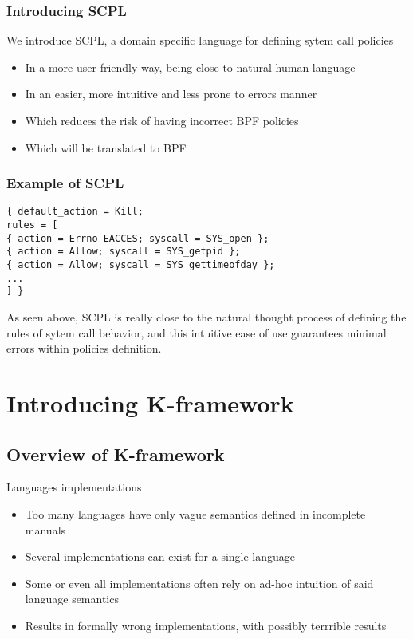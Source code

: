 \documentclass{beamer}
\begin{document}
\begin{frame}\frametitle{Introducing SCPL}
We introduce SCPL, a domain specific language for defining sytem call policies
\begin{itemize}[<+->]
	\item In a more user-friendly way, being close to natural human language
	\item In an easier, more intuitive and less prone to errors manner
	\item Which reduces the risk of having incorrect BPF policies
	\item Which will be translated to BPF
 \end{itemize}
\end{frame}

\begin{frame}[fragile]\frametitle{Example of SCPL}
\begin{verbatim}
{ default_action = Kill;
rules = [
{ action = Errno EACCES; syscall = SYS_open };
{ action = Allow; syscall = SYS_getpid };
{ action = Allow; syscall = SYS_gettimeofday };
...
] }
\end{verbatim}
\pause
As seen above, SCPL is really close to the natural thought process of defining the rules of sytem call behavior, and this intuitive ease of use guarantees minimal errors within policies definition.
\end{frame}



\section{Introducing K-framework}
 
\subsection{Overview of K-framework}
\begin{frame}{Languages implementations}
\begin{itemize}[<+->]
	\item Too many languages have only vague semantics defined in incomplete manuals
	\item Several implementations can exist for a single language
	\item Some or even all implementations often rely on ad-hoc intuition of said language semantics
	\item Results in formally wrong implementations, with possibly terrrible results
\end{itemize}
\end{frame}
\end{document}
